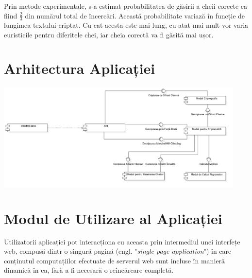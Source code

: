 \documentclass{article}
\begin{document}
Prin metode experimentale, s-a estimat probabilitatea de găsirii a cheii corecte ca fiind $\frac{2}{3}$ din numărul total de încercări. Această probabilitate variază în funcție de lungimea textului criptat. Cu cat acesta este mai lung, cu atat mai mult vor varia euristicile pentru diferitele chei, iar cheia corectă va fi găsită mai ușor.

\section{Arhitectura Aplicației}

\vspace{0.3cm}
\begin{center}
    \includegraphics[width=12.5cm]{images/components_diagram.png}
    \label{fig:1}
    \captionsetup{justification=centering,margin=1cm}
\end{center}
\vspace{0.3cm}

\section{Modul de Utilizare al Aplicației}

Utilizatorii aplicației pot interacționa cu aceasta prin intermediul unei interfețe web, compusă dintr-o singură pagină (engl. "\textit{single-page application}") în care conținutul computațiilor efectuate de serverul web sunt incluse în manieră dinamică în ea, fără a fi necesară o reîncărcare completă.
\end{document}
